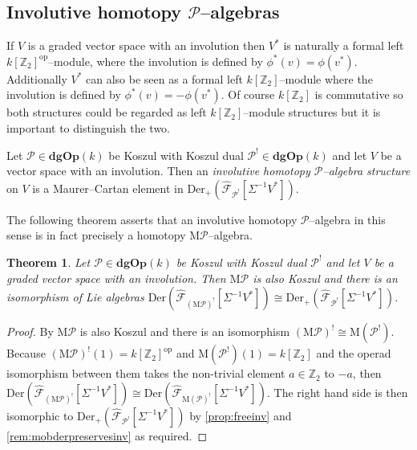 \documentclass[british]{amsart}
\theoremstyle{plain}
\newtheorem{theorem}{Theorem}[section]
\theoremstyle{definition}
{
\newaliascnt{{definition}}{theorem}\newtheorem{{definition}}[{definition}]{{Definition}}\aliascntresetthe{{definition}}\expandafterautorefname\endcsname{{Definition}}}
{
\newaliascnt{{remark}}{theorem}\newtheorem{{remark}}[{remark}]{{Remark}}\aliascntresetthe{{remark}}\expandafterautorefname\endcsname{{Remark}}}
{
\newaliascnt{{example}}{theorem}\newtheorem{{example}}[{example}]{{Example}}\aliascntresetthe{{example}}\expandafterautorefname\endcsname{{Example}}}
{
\newaliascnt{{examples}}{theorem}\newtheorem{{examples}}[{examples}]{{Examples}}\aliascntresetthe{{examples}}\expandafterautorefname\endcsname{{Examples}}}
{
\newaliascnt{{notation}}{theorem}\newtheorem{{notation}}[{notation}]{{Notation}}\aliascntresetthe{{notation}}\expandafterautorefname\endcsname{{Notation}}}
{
\newaliascnt{{convention}}{theorem}\newtheorem{{convention}}[{convention}]{{Convention}}\aliascntresetthe{{convention}}\expandafterautorefname\endcsname{{Convention}}}
\numberwithin{equation}{section}
\numberwithin{figure}{section}
\begin{document}
\subsection{Involutive homotopy \texorpdfstring{$\mathcal{P}$}{P}--algebras}
If $V$ is a graded vector space with an involution then $V^*$ is naturally a formal left $k[\mathbb{Z}_2]^{\mathrm{op}}$--module, where the involution is defined by $\phi^*(v)=\phi(v^*)$. Additionally $V^*$ can also be seen as a formal left $k[\mathbb{Z}_2]$--module where the involution is defined by $\phi^*(v)=-\phi(v^*)$. Of course $k[\mathbb{Z}_2]$ is commutative so both structures could be regarded as left $k[\mathbb{Z}_2]$--module structures but it is important to distinguish the two.

\begin{definition}
Let $\mathcal{P}\in{\mathbf{dgOp}}(k)$ be Koszul with Koszul dual $\mathcal{P}^!\in{\mathbf{dgOp}}(k)$ and let $V$ be a vector space with an involution. Then an \emph{involutive homotopy $\mathcal{P}$--algebra structure} on $V$ is a Maurer--Cartan element in ${\mathrm{Der}}_+({\widehat{\mathcal{F}}_{{\mathcal{P}^!}}[{\Sigma^{-1}V^*}]})$.
\end{definition}

The following theorem asserts that an involutive homotopy $\mathcal{P}$--algebra in this sense is in fact precisely a homotopy ${\mathrm{M}}\mathcal{P}$--algebra.

\begin{theorem}
Let $\mathcal{P}\in{\mathbf{dgOp}}(k)$ be Koszul with Koszul dual $\mathcal{P}^!$ and let $V$ be a graded vector space with an involution. Then ${\mathrm{M}}\mathcal{P}$ is also Koszul and there is an isomorphism of Lie algebras ${\mathrm{Der}}({\widehat{\mathcal{F}}_{{({\mathrm{M}}\mathcal{P})^!}}[{\Sigma^{-1}V^*}]}) \cong {\mathrm{Der}}_+({\widehat{\mathcal{F}}_{{\mathcal{P}^!}}[{\Sigma^{-1}V^*}]})$.
\end{theorem}

\begin{proof}
By \cite[Theorem 3.33]{braun:moduliklein} ${\mathrm{M}}\mathcal{P}$ is also Koszul and there is an isomorphism $({\mathrm{M}}\mathcal{P})^!\cong{\mathrm{M}}(\mathcal{P}^!)$. Because $({\mathrm{M}}\mathcal{P})^!(1) = k[\mathbb{Z}_2]^{\mathrm{op}}$ and ${\mathrm{M}}(\mathcal{P}^!)(1)=k[\mathbb{Z}_2]$ and the operad isomorphism between them takes the non-trivial element $a\in \mathbb{Z}_2$ to $-a$, then ${\mathrm{Der}}({\widehat{\mathcal{F}}_{{({\mathrm{M}}\mathcal{P})^!}}[{\Sigma^{-1}V^*}]}) \cong {\mathrm{Der}}({\widehat{\mathcal{F}}_{{{\mathrm{M}}(\mathcal{P})^!}}[{\Sigma^{-1}V^*}]})$. The right hand side is then isomorphic to ${\mathrm{Der}}_+({\widehat{\mathcal{F}}_{{\mathcal{P}^!}}[{\Sigma^{-1}V^*}]})$ by \autoref{prop:freeinv} and \autoref{rem:mobderpreservesinv} as required.
\end{proof}
\end{document}
